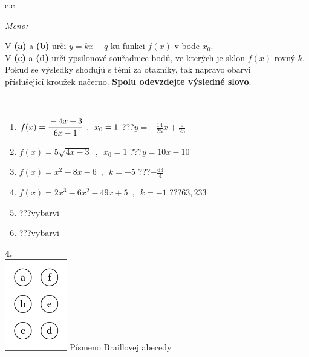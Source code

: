 \documentclass[10pt]{report}
\begin{document}
\begin{tabular}{c:c}
\begin{minipage}[c][104.5mm][t]{0.5\linewidth}
\begin{center}
\textit{Meno:}\phantom{xxxxxxxxxxxxxxxxxxxxxxxxxxxxxxxxxxxxxxxxxxxxxxxxxxxxxxxxxxxxxxxxx}\\[5mm]
\begin{minipage}{0.95\linewidth}
\begin{center}
V \textbf{(a)} a \textbf{(b)} urči  $y = kx + q$ ku funkci $f(x)$ v bode $x_0$.\\V \textbf{(c)} a \textbf{(d)} urči ypsilonové souřadnice bodů, ve kterých je sklon $f(x)$ rovný $k$.\\Pokud se výsledky shodujú s těmi za otazníky, tak napravo obarvi\\příslušející kroužek načerno. \textbf{Spolu odevzdejte výsledné slovo}.
\end{center}
\end{minipage}
\\[1mm]
\begin{minipage}{0.79\linewidth}
\begin{center}
\begin{varwidth}{\linewidth}
\begin{enumerate}
\small
\item $f(x)=\cfrac{-4x+3}{6x-1}\enspace , \enspace x_0=1$\quad \dotfill\; ???\;\dotfill \quad $y = -\frac{14}{25}x+\frac{9}{25}$
\item $f(x)=5\sqrt{4x-3}\enspace , \enspace x_0=1$\quad \dotfill\; ???\;\dotfill \quad $y = 10x-10$
\item $f(x)=x^2-8x-6\enspace , \enspace k=-5$\quad \dotfill\; ???\;\dotfill \quad $-\frac{63}{4}$
\item $f(x)=2x^3-6x^2-49x+5\enspace , \enspace k=-1$\quad \dotfill\; ???\;\dotfill \quad $63 , 233$
\item \quad \dotfill\; ???\;\dotfill \quad vybarvi
\item \quad \dotfill\; ???\;\dotfill \quad vybarvi
\end{enumerate}
\end{varwidth}
\end{center}
\end{minipage}
\begin{minipage}{0.20\linewidth}
\begin{center}
{\Huge\bfseries 4.} \\[2mm]
\includegraphics[height=40mm]{../images/braille.png}
{\small Písmeno Braillovej abecedy}
\end{center}
\end{minipage}
\end{center}
\end{minipage}
%
\end{tabular}
\end{document}
